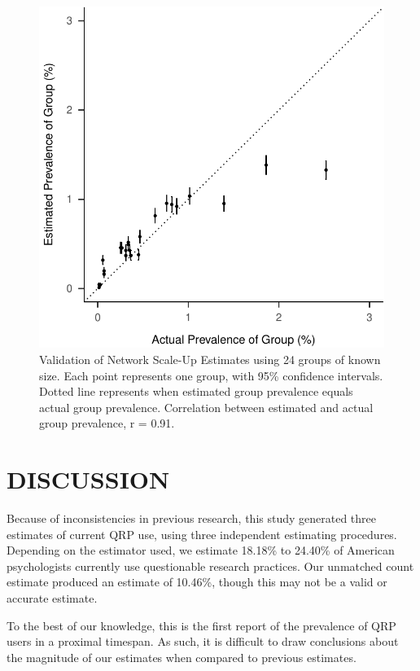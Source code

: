 \documentclass[jou]{apa6}
\theoremstyle{definition}
\theoremstyle{definition}
\theoremstyle{definition}
\theoremstyle{remark}
\begin{document}
\begin{figure}
\centering
\includegraphics{papaja_paper_20180810_files/figure-latex/unnamed-chunk-14-1.pdf}
\caption{\label{fig:unnamed-chunk-14}\label{fig:validity}Validation of
Network Scale-Up Estimates using 24 groups of known size. Each point
represents one group, with 95\% confidence intervals. Dotted line
represents when estimated group prevalence equals actual group
prevalence. Correlation between estimated and actual group prevalence, r
= 0.91.}
\end{figure}

\section{DISCUSSION}\label{discussion}

Because of inconsistencies in previous research, this study generated
three estimates of current QRP use, using three independent estimating
procedures. Depending on the estimator used, we estimate 18.18\% to
24.40\% of American psychologists currently use questionable research
practices. Our unmatched count estimate produced an estimate of 10.46\%,
though this may not be a valid or accurate estimate.

To the best of our knowledge, this is the first report of the prevalence
of QRP users in a proximal timespan. As such, it is difficult to draw
conclusions about the magnitude of our estimates when compared to
previous estimates.
\end{document}
